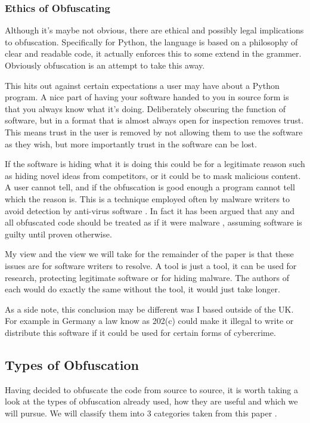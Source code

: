 \documentclass{report}
\begin{document}
\subsubsection{Ethics of Obfuscating}

Although it's maybe not obvious, there are ethical and possibly legal implications to obfuscation.
Specifically for Python, the language is based on a philosophy of clear and readable code, it actually
enforces this to some extend in the grammer. Obviously obfuscation is an attempt to take this away.

This hits out against certain expectations a user may have about a Python program. A nice part of having your
software handed to you in source form is that you always know what it's doing. Deliberately obscuring the
function of software, but in a format that is almost always open for inspection removes trust. This means
trust in the user is removed by not allowing them to use the software as they wish, but more importantly
trust in the software can be lost.

If the software is hiding what it is doing this could be for a legitimate reason such as hiding novel ideas
from competitors, or it could be to mask malicious content. A user cannot tell, and if the obfuscation is
good enough a program cannot tell which the reason is. This is a technique employed often by malware
writers to avoid detection by anti-virus software \cite{dycodeobf}. In fact it has been argued that any and
all obfuscated code should be treated as if it were malware \cite{noobf}, assuming software is guilty until
proven otherwise.

My view and the view we will take for the remainder of the paper is that these issues are for software writers to
resolve. A tool is just a tool, it can be used for research, protecting legitimate software or for hiding
malware. The authors of each would do exactly the same without the tool, it would just take longer.

As a side note, this conclusion may be different was I based outside of the UK. For example in Germany a law
know as 202(c) \cite{202c} could make it illegal to write or distribute this software if it could be used for
certain forms of cybercrime.

\subsection{Types of Obfuscation}

Having decided to obfuscate the code from source to source, it is worth taking a look at the types of
obfuscation already used, how they are useful and which we will pursue. We will classify them into 3 categories
taken from this paper \cite[p10]{desevobf}.
\end{document}

